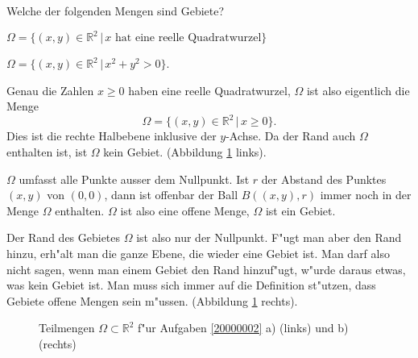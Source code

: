 Welche der folgenden Mengen sind Gebiete?
\begin{teilaufgaben}
\item $\Omega=\{(x,y)\in\mathbb R^2\,|\, \text{$x$ hat eine reelle Quadratwurzel}\}$
\item $\Omega=\{(x,y)\in\mathbb R^2\,|\, x^2+y^2>0\}$.
\end{teilaufgaben}


\begin{loesung}
\begin{teilaufgaben}
\item
Genau die Zahlen $x\ge 0$ haben eine reelle Quadratwurzel, $\Omega$ ist
also eigentlich die Menge
\[
\Omega=\{(x,y)\in\mathbb R^2\,|\, x\ge 0\}.
\]
Dies ist die rechte Halbebene inklusive der $y$-Achse. Da der Rand
auch $\Omega$ enthalten ist, ist $\Omega$ kein Gebiet.
(Abbildung \ref{20000002:fig} links).
\item
$\Omega$ umfasst alle Punkte ausser dem Nullpunkt. Ist $r$ der Abstand
des Punktes $(x,y)$ von $(0,0)$, dann ist offenbar der Ball $B((x,y),r)$
immer noch in der Menge $\Omega$ enthalten. $\Omega$ ist also eine offene
Menge, $\Omega$ ist ein Gebiet.

Der Rand des Gebietes $\Omega$ ist also nur der Nullpunkt. F"ugt man
aber den Rand hinzu, erh"alt man die ganze Ebene, die wieder eine
Gebiet ist. Man darf also nicht sagen, wenn man einem Gebiet den Rand
hinzuf"ugt, w"urde daraus etwas, was kein Gebiet ist. Man muss sich immer
auf die Definition st"utzen, dass Gebiete offene Mengen sein m"ussen.
(Abbildung \ref{20000002:fig} rechts).
\end{teilaufgaben}
\begin{figure}
\begin{center}
\qquad
{}
\end{center}
\caption{Teilmengen $\Omega\subset\mathbb R^2$ f"ur Aufgaben \ref{20000002} a)
(links) 
und b) (rechts)\label{20000002:fig}}
\end{figure}
\end{loesung}
